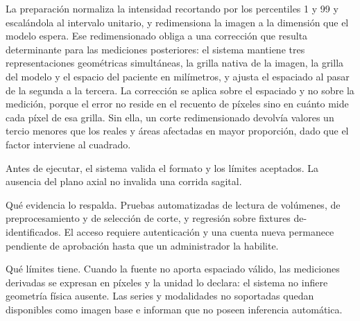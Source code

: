 
La preparación normaliza la intensidad recortando por los percentiles 1 y 99 y escalándola al intervalo unitario, y redimensiona la imagen a la dimensión que el modelo espera. Ese redimensionado obliga a una corrección que resulta determinante para las mediciones posteriores: el sistema mantiene tres representaciones geométricas simultáneas, la grilla nativa de la imagen, la grilla del modelo y el espacio del paciente en milímetros, y ajusta el espaciado al pasar de la segunda a la tercera. La corrección se aplica sobre el espaciado y no sobre la medición, porque el error no reside en el recuento de píxeles sino en cuánto mide cada píxel de esa grilla. Sin ella, un corte redimensionado devolvía valores un tercio menores que los reales y áreas afectadas en mayor proporción, dado que el factor interviene al cuadrado.

Antes de ejecutar, el sistema valida el formato y los límites aceptados. La ausencia del plano axial no invalida una corrida sagital.



Qué evidencia lo respalda. Pruebas automatizadas de lectura de volúmenes, de preprocesamiento y de selección de corte, y regresión sobre fixtures de-identificados. El acceso requiere autenticación y una cuenta nueva permanece pendiente de aprobación hasta que un administrador la habilite.

Qué límites tiene. Cuando la fuente no aporta espaciado válido, las mediciones derivadas se expresan en píxeles y la unidad lo declara: el sistema no infiere geometría física ausente. Las series y modalidades no soportadas quedan disponibles como imagen base e informan que no poseen inferencia automática.

